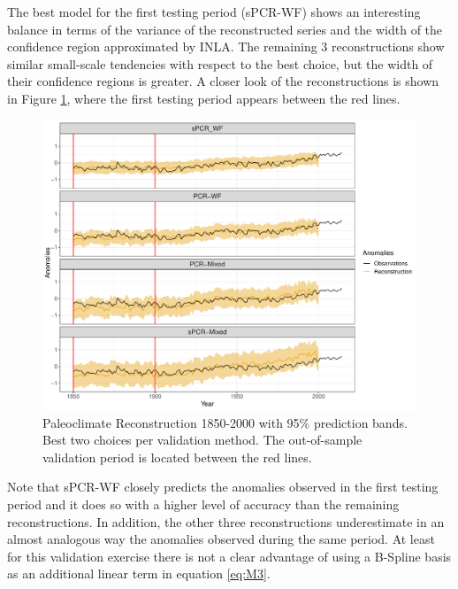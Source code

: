 \documentclass[12pt]{amsart}
\theoremstyle{plain}
\theoremstyle{definition}
\theoremstyle{remark}
\begin{document}
The best model for the first testing period (sPCR-WF) shows an interesting
balance in terms of the variance of the reconstructed series and the width of
the confidence region approximated by INLA. The remaining 3 reconstructions show
similar small-scale tendencies with respect to the best choice, but the width of
their confidence regions is greater. A closer look of the reconstructions is shown in Figure
\ref{fig:paleo19001}, where the first testing period appears between the red lines.
\begin{figure}[h!]
  \centering
  \includegraphics[scale=0.40]{Rec1900_Final}
  \caption{Paleoclimate Reconstruction 1850-2000 with 95\%
    prediction bands. Best two choices per validation method. The out-of-sample validation period is
    located between the red lines.}
  \label{fig:paleo19001}
\end{figure}
Note that sPCR-WF closely predicts the anomalies observed in the first testing
period and it does so with a higher level of accuracy than the remaining
reconstructions. In addition, the other three reconstructions underestimate in
an almost analogous way the anomalies observed during the same period. At least
for this validation exercise there is not a clear advantage of using a B-Spline
basis as an additional linear term in equation \eqref{eq:M3}.
\end{document}
